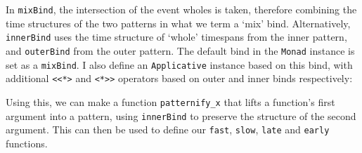 In \texttt{mixBind}, the intersection of the event wholes is taken,
therefore combining the time structures of the two patterns in what we
term a `mix' bind. Alternatively, \texttt{innerBind} uses the time
structure of `whole' timespans from the inner pattern, and
\texttt{outerBind} from the outer pattern. The default bind in the
\texttt{Monad} instance is set as a \texttt{mixBind}. I also define an
\texttt{Applicative} instance based on this bind, with additional
\texttt{\textless{}\textless{}*\textgreater{}} and
\texttt{\textless{}*\textgreater{}\textgreater{}} operators based on
outer and inner binds respectively:

\begin{Shaded}
\begin{Highlighting}[]
   
\NormalTok{  (}\OperatorTok{\textgreater{}\textgreater{}=}\NormalTok{) }\OtherTok{=}

   
   \OtherTok{=}
\OperatorTok{\textless{}*\textgreater{}}\OtherTok{=}\NormalTok{ (}\OperatorTok{\textless{}$\textgreater{}}

\OperatorTok{\textless{}\textless{}*\textgreater{}}\OtherTok{=}\NormalTok{ (}\OperatorTok{\textless{}$\textgreater{}}
\OperatorTok{\textless{}*\textgreater{}\textgreater{}}\OtherTok{=}\NormalTok{ (}\OperatorTok{\textless{}$\textgreater{}}
\end{Highlighting}
\end{Shaded}

Using this, we can make a function \texttt{patternify\_x} that lifts a
function's first argument into a pattern, using \texttt{innerBind} to
preserve the structure of the second argument. This can then be used to
define our \texttt{fast}, \texttt{slow}, \texttt{late} and
\texttt{early} functions.

